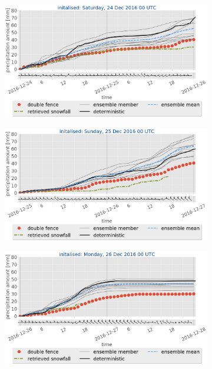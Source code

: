 \begin{figure}[H]%
	\centering
	\begin{subfigure}[t]{0.99\textwidth}			\includegraphics[trim={0.cm 5.2cm 0.cm 0cm},clip,width=\textwidth]{./fig_sfc_acc/acc_wind_20161224_00}
		\caption{}\label{fig:sfc_acc24}
	\end{subfigure}
	\begin{subfigure}[t]{0.99\textwidth}
		\includegraphics[trim={0.cm 3.6cm 0.cm 0cm},clip,width=\textwidth]{./fig_sfc_acc/acc_wind_20161225_00}
		\caption{}\label{fig:sfc_acc25}
	\end{subfigure}
	\begin{subfigure}[t]{0.99\textwidth}	\includegraphics[trim={0.cm 3.6cm 0.cm 0cm},clip,width=\textwidth]{./fig_sfc_acc/acc_wind_20161226_00}

\end{subfigure}
\end{figure}
